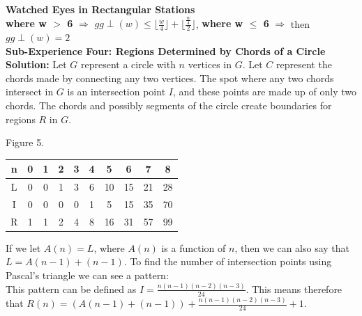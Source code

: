 \documentclass[10pt,a4paper]{report}
\begin{document}
		\textbf{Watched Eyes in Rectangular Stations}\\
		\textbf{where w $>$ 6} $\Longrightarrow$  $gg\perp(w) \leq \lfloor \frac{w}{4} \rfloor + \lfloor \frac{\frac{w}{4}}{2} \rfloor$, \textbf{where w $\leq$ 6} $\Longrightarrow$ then $gg\perp(w) = 2$\\
		
	\textbf{Sub-Experience Four: Regions Determined by Chords of a Circle}\\
	
	\noindent\textbf{Solution: }Let $G$ represent a circle with $n$ vertices in $G$.  Let $C$ represent the chords made by connecting any two vertices.  The spot where any two chords intersect in $G$ is an intersection point $I$, and these points are made up of only two chords.  The chords and possibly segments of the circle create boundaries for regions $R$ in $G$.\\
	
	\begin{center}
		Figure 5.\\
		\begin{tabular}{c|c c c c c c c c c}
		n & 0 & 1 & 2 & 3 & 4 & 5 & 6 & 7 & 8\\
	\hline
	\hline
		L & 0 & 0 & 1 & 3 & 6 & 10 & 15 & 21 & 28\\
		I & 0 & 0 & 0 & 0 & 1 & 5 & 15 & 35 & 70\\
		R & 1 & 1 & 2 & 4 & 8 & 16 & 31 & 57 & 99\\
		\end{tabular}
	\end{center}

	\noindent If we let $A(n)=L$, where $A(n)$ is a function of $n$, then we can also say that $L=A(n-1)+(n-1)$.  To find the number of intersection points using Pascal's triangle we can see a pattern:\\
	
	\noindent This pattern can be defined as $I=\frac{n(n-1)(n-2)(n-3)}{24}$.  This means therefore that $R(n)=(A(n-1)+(n-1))+\frac{n(n-1)(n-2)(n-3)}{24}+1$.
	
\end{document}
